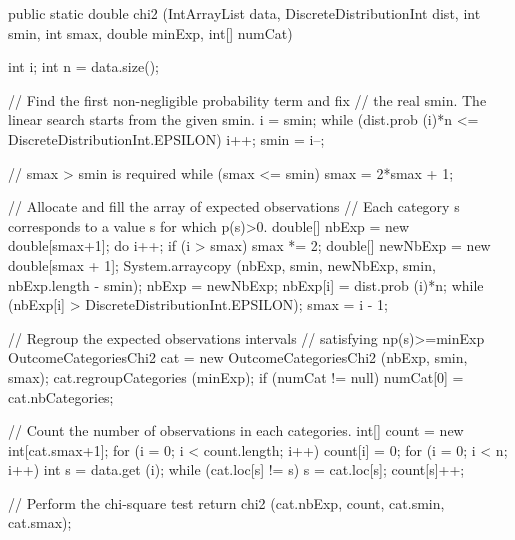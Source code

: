 \begin{code}

   public static double chi2 (IntArrayList data, DiscreteDistributionInt dist,
                              int smin, int smax, double minExp, int[] numCat)\begin{hide} {
      int i;
      int n = data.size();

      // Find the first non-negligible probability term and fix
      // the real smin.  The linear search starts from the given smin.
      i = smin;
      while (dist.prob (i)*n <= DiscreteDistributionInt.EPSILON)
         i++;
      smin = i--;

      // smax > smin is required
      while (smax <= smin)
         smax = 2*smax + 1;

      // Allocate and fill the array of expected observations
      // Each category s corresponds to a value s for which p(s)>0.
      double[] nbExp = new double[smax+1];
      do {
         i++;
         if (i > smax) {
            smax *= 2;
            double[] newNbExp = new double[smax + 1];
            System.arraycopy (nbExp, smin, newNbExp, smin, nbExp.length - smin);
            nbExp = newNbExp;
         }
         nbExp[i] = dist.prob (i)*n;
      }
      while (nbExp[i] > DiscreteDistributionInt.EPSILON);
      smax = i - 1;

      // Regroup the expected observations intervals
      // satisfying np(s)>=minExp
      OutcomeCategoriesChi2 cat = new OutcomeCategoriesChi2
         (nbExp, smin, smax);
      cat.regroupCategories (minExp);
      if (numCat != null)
         numCat[0] = cat.nbCategories;

      // Count the number of observations in each categories.
      int[] count = new int[cat.smax+1];
      for (i = 0; i < count.length; i++)
         count[i] = 0;
      for (i = 0; i < n; i++) {
         int s = data.get (i);
         while (cat.loc[s] != s)
            s = cat.loc[s];
         count[s]++;
      }

      // Perform the chi-square test
      return chi2 (cat.nbExp, count, cat.smin, cat.smax);
   }\end{hide}
\end{code}
